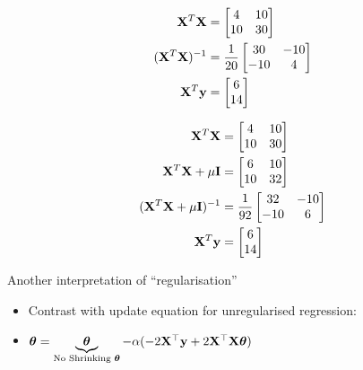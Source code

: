 \documentclass{beamer}
\begin{document}
\begin{frame}\begin{align*}
\mathbf{X}^{T}\mathbf{X} &= \begin{bmatrix}
4 &10\\10&30
\end{bmatrix} \\
(\mathbf{X}^{T}\mathbf{X})^{-1} &= \frac{1}{20} \begin{bmatrix}
30 & -10\\
-10& 4
\end{bmatrix}\\
\mathbf{X}^{T}\mathbf{y} &= \begin{bmatrix}
6\\
14
\end{bmatrix}
\end{align*}
\end{frame}

\begin{frame}\begin{align*}
\mathbf{X}^{T}\mathbf{X} &= \begin{bmatrix}
4 &10\\10&30
\end{bmatrix} \\
\mathbf{X}^{T}\mathbf{X}+\mu \mathbf{I} &= \begin{bmatrix}
6 &10\\10&32
\end{bmatrix} \\
(\mathbf{X}^{T}\mathbf{X}+\mu \mathbf{I})^{-1} &= \frac{1}{92} \begin{bmatrix}
32 & -10\\
-10& 6
\end{bmatrix}\\
\mathbf{X}^{T}\mathbf{y} &= \begin{bmatrix}
6\\
14
\end{bmatrix}
\end{align*}
\end{frame}

\begin{frame}Another interpretation of ``regularisation''
\end{frame}

\begin{frame}\begin{itemize}
\item Contrast with update equation for unregularised regression:
	\item \(\boldsymbol{\theta}=\underbrace{\boldsymbol{\theta}}_\text{No Shrinking $\boldsymbol{\theta}$} - \alpha(-2 \mathbf{X}^{\top} \mathbf{y}+2 \mathbf{X}^{\top} \mathbf{X} \boldsymbol{\theta})\)
	
\end{itemize}

\end{frame}

%	
\end{document}
